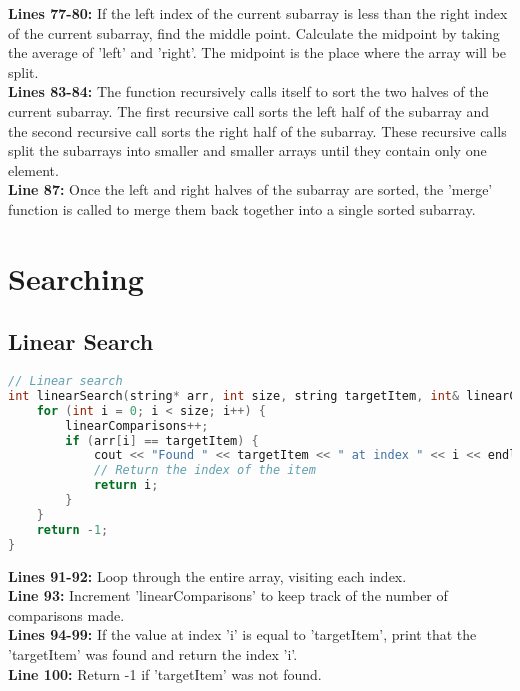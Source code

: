 \documentclass[letterpaper, 10pt,DIV=13]{scrartcl}
\numberwithin{equation}{section} %
\numberwithin{figure}{section} %
\numberwithin{table}{section} %
\begin{document}
\textbf{Lines 77-80:}  If the left index of the current subarray is less than the right index of the current subarray, find the middle point. Calculate the midpoint by taking the average of 'left' and 'right'. The midpoint is the place where the array will be split. \\
\textbf{Lines 83-84:} The function recursively calls itself to sort the two halves of the current subarray. The first recursive call sorts the left half of the subarray and the second recursive call sorts the right half of the subarray. These recursive calls split the subarrays into smaller and smaller arrays until they contain only one element. \\
\textbf{Line 87:} Once the left and right halves of the subarray are sorted, the 'merge' function is called to merge them back together into a single sorted subarray.



\pagebreak

\section{Searching}
\subsection{Linear Search}

\begin{linenumbers}
\begin{lstlisting}[language=C++, caption={Linear Search}, label={code:example}]
// Linear search
int linearSearch(string* arr, int size, string targetItem, int& linearComparisons) {
    for (int i = 0; i < size; i++) {
        linearComparisons++;
        if (arr[i] == targetItem) {
            cout << "Found " << targetItem << " at index " << i << endl;
            // Return the index of the item
            return i;
        }
    }
    return -1;
}
\end{lstlisting}
\end{linenumbers}
\nolinenumbers

\textbf{Lines 91-92:} Loop through the entire array, visiting each index. \\
\textbf{Line 93:} Increment 'linearComparisons' to keep track of the number of comparisons made. \\
\textbf{Lines 94-99:} If the value at index 'i' is equal to 'targetItem', print that the 'targetItem' was found and return the index 'i'. \\
\textbf{Line 100:} Return -1 if 'targetItem' was not found.
\end{document}
